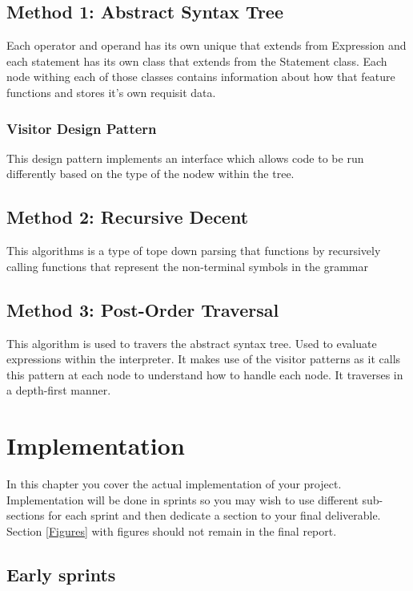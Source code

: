 \documentclass[a4paper, oneside, 11pt]{report}
\begin{document}
\section{Method 1: Abstract Syntax Tree}

Each operator and operand has its own unique that extends from Expression and each
statement has its own class that extends from the Statement class. Each node withing
each of those classes contains information about how that feature functions and stores it’s
own requisit data.

\subsection{Visitor Design Pattern}

This design pattern implements an interface which allows code to be run differently based
on the type of the nodew within the tree.

\section{Method 2: Recursive Decent}

This algorithms is a type of tope down parsing that functions by recursively calling functions that represent the non-terminal symbols in the grammar

\section{Method 3: Post-Order Traversal}

This algorithm is used to travers the abstract syntax tree. Used to evaluate expressions
within the interpreter. It makes use of the visitor patterns as it calls this pattern at each
node to understand how to handle each node. It traverses in a depth-first manner.


\chapter{Implementation}\label{Impl}

In this chapter you cover the actual implementation of your project. Implementation will be done in sprints so you may wish to use different sub-sections for each sprint and then dedicate a section to your final deliverable. Section \ref{Figures} with figures  should not remain in the final report.

\section{Early sprints}
\end{document}
